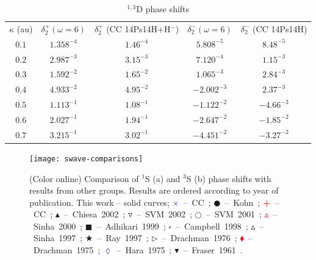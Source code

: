 \documentclass[reprint,showpacs,preprintnumbers,amsmath,amssymb,pra,aps]{revtex4-1}
\begin{document}
\begin{table}
\begin{center}
\begin{ruledtabular}
\begin{tabular}{c c c c c}
$\kappa$ (au) & $\delta_2^+ (\omega = 6)$ & $\delta_2^+$ (CC 14Ps14H+H$^-$) \cite{Walters2004} & $\delta_2^- (\omega = 6)$ & $\delta_2^-$ (CC 14Ps14H) \cite{Blackwood2002} \\
\colrule
$0.1$ & $1.358^{-4}$ & $1.46^{-4}$ & $5.808^{-5}$ & $8.48^{-5}$ \\
$0.2$ & $2.987^{-3}$ & $3.15^{-3}$ & $7.120^{-4}$ & $1.15^{-3}$ \\
$0.3$ & $1.592^{-2}$ & $1.65^{-2}$ & $1.065^{-3}$ & $2.84^{-3}$ \\
$0.4$ & $4.933^{-2}$ & $4.95^{-2}$ & $-2.002^{-3}$ & $2.37^{-3}$ \\
$0.5$ & $1.113^{-1}$ & $1.08^{-1}$ & $-1.122^{-2}$ & $-4.66^{-3}$ \\
$0.6$ & $2.027^{-1}$ & $1.94^{-1}$ & $-2.647^{-2}$ & $-1.85^{-2}$ \\
$0.7$ & $3.215^{-1}$ & $3.02^{-1}$ & $-4.451^{-2}$ & $-3.27^{-2}$ \\
\end{tabular}
\end{ruledtabular}
\caption{$^{1,3}$D phase shifts}
\label{tab:DWavePhase}
\end{center}
\end{table}



\begin{figure}[H]
	\centering
	\texttt{[image: swave-comparisons]}
	\caption{(Color online) Comparison of $^1$S (a) and $^3$S (b) phase shifts with results from other groups. Results are ordered according to year of publication. This work -- solid curves; \mbox{\textcolor{blue}{$\times$} -- CC \cite{Walters2004};} \mbox{$\CIRCLE$ -- Kohn \cite{VanReeth2003};} \mbox{\textcolor{red}{\textbf{+}} -- CC \cite{Blackwood2002};} \mbox{$\blacktriangle$ -- Chiesa 2002 \cite{Chiesa2002};} \mbox{$\triangledown$ -- SVM 2002 \cite{Ivanov2002};} \mbox{$\Circle$ -- SVM 2001 \cite{Ivanov2001};} \mbox{\textcolor{red}{$\vartriangle$} -- Sinha 2000 \cite{Sinha2000};} \mbox{$\blacksquare$ -- Adhikari 1999 \cite{Adhikari1999};} \mbox{$\square$ -- Campbell 1998 \cite{Campbell1998};} \mbox{$\vartriangle$ -- Sinha 1997 \cite{Sinha1997};} \mbox{\textcolor[RGB]{0,127,0}{$\bigstar$} -- Ray 1997 \cite{Ray1997};} \mbox{$\triangleright$ -- Drachman 1976 \cite{Drachman1976};} \mbox{\textcolor{red}{$\blacklozenge$} -- Drachman 1975 \cite{Drachman1975};} \mbox{\textcolor{blue}{$\lozenge$} -- Hara 1975 \cite{Hara1975};} \mbox{$\blacktriangledown$ -- Fraser 1961 \cite{Fraser1961}.}}
	\label{fig:swave-comparisons}
\end{figure}
\end{document}
